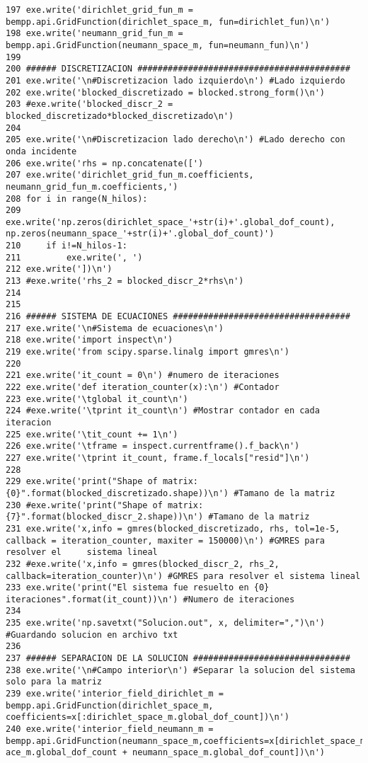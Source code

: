 \documentclass[12pt,letterpaper]{article}
\numberwithin{equation}{section}
\begin{document}
\begin{lstlisting}
197 exe.write('dirichlet_grid_fun_m = bempp.api.GridFunction(dirichlet_space_m, fun=dirichlet_fun)\n')
198 exe.write('neumann_grid_fun_m = bempp.api.GridFunction(neumann_space_m, fun=neumann_fun)\n')
199 
200 ###### DISCRETIZACION ##########################################
201 exe.write('\n#Discretizacion lado izquierdo\n') #Lado izquierdo
202 exe.write('blocked_discretizado = blocked.strong_form()\n')
203 #exe.write('blocked_discr_2 = blocked_discretizado*blocked_discretizado\n')
204 
205 exe.write('\n#Discretizacion lado derecho\n') #Lado derecho con onda incidente
206 exe.write('rhs = np.concatenate([')
207 exe.write('dirichlet_grid_fun_m.coefficients, neumann_grid_fun_m.coefficients,')
208 for i in range(N_hilos):
209     exe.write('np.zeros(dirichlet_space_'+str(i)+'.global_dof_count), np.zeros(neumann_space_'+str(i)+'.global_dof_count)')
210     if i!=N_hilos-1:
211         exe.write(', ')
212 exe.write('])\n')
213 #exe.write('rhs_2 = blocked_discr_2*rhs\n')
214 
215 
216 ###### SISTEMA DE ECUACIONES ###################################
217 exe.write('\n#Sistema de ecuaciones\n')
218 exe.write('import inspect\n')
219 exe.write('from scipy.sparse.linalg import gmres\n')
220 
221 exe.write('it_count = 0\n') #numero de iteraciones
222 exe.write('def iteration_counter(x):\n') #Contador
223 exe.write('\tglobal it_count\n')
224 #exe.write('\tprint it_count\n') #Mostrar contador en cada iteracion
225 exe.write('\tit_count += 1\n')
226 exe.write('\tframe = inspect.currentframe().f_back\n')
227 exe.write('\tprint it_count, frame.f_locals["resid"]\n')
228 
229 exe.write('print("Shape of matrix: {0}".format(blocked_discretizado.shape))\n') #Tamano de la matriz
230 #exe.write('print("Shape of matrix: {7}".format(blocked_discr_2.shape))\n') #Tamano de la matriz
231 exe.write('x,info = gmres(blocked_discretizado, rhs, tol=1e-5, callback = iteration_counter, maxiter = 150000)\n') #GMRES para resolver el     sistema lineal
232 #exe.write('x,info = gmres(blocked_discr_2, rhs_2, callback=iteration_counter)\n') #GMRES para resolver el sistema lineal
233 exe.write('print("El sistema fue resuelto en {0} iteraciones".format(it_count))\n') #Numero de iteraciones
234 
235 exe.write('np.savetxt("Solucion.out", x, delimiter=",")\n') #Guardando solucion en archivo txt
236 
237 ###### SEPARACION DE LA SOLUCION ###############################
238 exe.write('\n#Campo interior\n') #Separar la solucion del sistema solo para la matriz
239 exe.write('interior_field_dirichlet_m = bempp.api.GridFunction(dirichlet_space_m, coefficients=x[:dirichlet_space_m.global_dof_count])\n')
240 exe.write('interior_field_neumann_m = bempp.api.GridFunction(neumann_space_m,coefficients=x[dirichlet_space_m.global_dof_count:dirichlet_sp    ace_m.global_dof_count + neumann_space_m.global_dof_count])\n')

\end{lstlisting}
\end{document}
